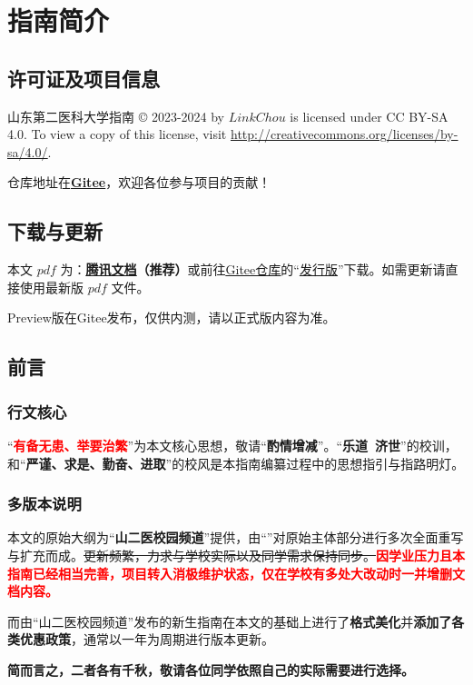 \chapter[指南简介]{指南简介}

\section[许可证及项目信息]{许可证及项目信息}
山东第二医科大学指南 © 2023-2024 by $LinkChou$ is licensed under CC BY-SA 4.0. To view a copy of this license, visit \uline{\href{http://creativecommons.org/licenses/by-sa/4.0/}{http://creativecommons.org/licenses/by-sa/4.0/}}.

仓库地址在\textbf{\uline{\href{https://gitee.com/LinkChou/sdsmu_welcome_tex}{Gitee}}}，欢迎各位参与项目的贡献！

\section[\textcolor{red}{下载与更新}]{下载与更新}
本文 $pdf$ \textbf{}为：\textbf{\uline{\textcolor{red}{\href{https://docs.qq.com/s/ETcQ-ZFSrSsh6MK9bm773q}{腾讯文档}}}（推荐）}或前往\uline{\href{https://gitee.com/LinkChou/sdsmu_welcome_tex}{Gitee仓库}}的“\uline{\href{https://gitee.com/LinkChou/sdsmu_welcome_tex/releases/latest}{发行版}}”下载。如需更新请直接使用最新版 $pdf$ 文件。

Preview版在Gitee发布，仅供内测，请以正式版内容为准。

\section[前言]{前言}
\subsection[行文核心]{行文核心}
“\textcolor{red}{\textbf{有备无患、举要治繁}}”为本文核心思想，敬请“\textbf{酌情增减}”。“\textbf{乐道\ 济世}”的校训，和“\textbf{严谨、求是、勤奋、进取}”的校风是本指南编纂过程中的思想指引与指路明灯。

\subsection[多版本说明]{多版本说明}
本文的原始大纲为“\textbf{山二医校园频道}”提供，由“\textbf{}”对原始主体部分进行多次全面重写与扩充而成。\sout{更新频繁，力求与学校实际以及同学需求保持同步。}\textcolor{red}{\textbf{因学业压力且本指南已经相当完善，项目转入消极维护状态，仅在学校有多处大改动时一并增删文档内容。}}

而由“山二医校园频道”发布的新生指南在本文的基础上进行了\textbf{格式美化}并\textbf{添加了各类优惠政策}，通常以一年为周期进行版本更新。

\textbf{简而言之，二者各有千秋，敬请各位同学依照自己的实际需要进行选择。}
